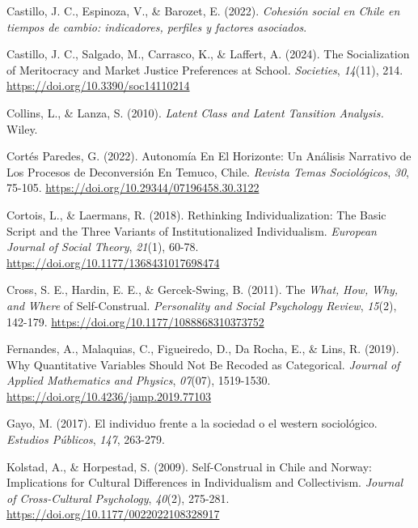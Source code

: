 \documentclass[
  12pt,
  letterpaper,
  DIV=11,
  numbers=noendperiod]{scrartcl}
\newlength{\cslhangindent}
\newenvironment{CSLReferences}[2] %
 {\begin{list}{}{%
  \setlength{\itemindent}{0pt}
  \setlength{\leftmargin}{0pt}
  \setlength{\parsep}{0pt}
  \ifodd #1
   \setlength{\leftmargin}{\cslhangindent}
   \setlength{\itemindent}{-1\cslhangindent}
  \fi
  \setlength{\itemsep}{#2\baselineskip}}}
 {\end{list}}
\begin{document}
\begin{CSLReferences}{1}{0}
Castillo, J. C., Espinoza, V., \& Barozet, E. (2022). \emph{{Cohesi{ó}n
social en Chile en tiempos de cambio: indicadores, perfiles y factores
asociados}}.

Castillo, J. C., Salgado, M., Carrasco, K., \& Laffert, A. (2024). The
{Socialization} of {Meritocracy} and {Market Justice Preferences} at
{School}. \emph{Societies}, \emph{14}(11), 214.
\url{https://doi.org/10.3390/soc14110214}

Collins, L., \& Lanza, S. (2010). \emph{Latent Class and Latent
Tansition Analysis.} Wiley.

Cortés Paredes, G. (2022). Autonom{í}a En El Horizonte: Un An{á}lisis
Narrativo de Los Procesos de Deconversi{ó}n En {Temuco}, {Chile}.
\emph{Revista Temas Sociol{ó}gicos}, \emph{30}, 75-105.
\url{https://doi.org/10.29344/07196458.30.3122}

Cortois, L., \& Laermans, R. (2018). Rethinking Individualization: {The}
Basic Script and the Three Variants of Institutionalized Individualism.
\emph{European Journal of Social Theory}, \emph{21}(1), 60-78.
\url{https://doi.org/10.1177/1368431017698474}

Cross, S. E., Hardin, E. E., \& Gercek-Swing, B. (2011). The
{\emph{What}}{\emph{,} }{\emph{How}}{\emph{,} }{\emph{Why}}{\emph{, and}
}{\emph{Where}} of {Self-Construal}. \emph{Personality and Social
Psychology Review}, \emph{15}(2), 142-179.
\url{https://doi.org/10.1177/1088868310373752}

Fernandes, A., Malaquias, C., Figueiredo, D., Da Rocha, E., \& Lins, R.
(2019). Why {Quantitative Variables Should Not Be Recoded} as
{Categorical}. \emph{Journal of Applied Mathematics and Physics},
\emph{07}(07), 1519-1530. \url{https://doi.org/10.4236/jamp.2019.77103}

Gayo, M. (2017). {El individuo frente a la sociedad o el western
sociol{ó}gico}. \emph{Estudios P{ú}blicos}, \emph{147}, 263-279.

Kolstad, A., \& Horpestad, S. (2009). Self-{Construal} in {Chile} and
{Norway}: {Implications} for {Cultural Differences} in {Individualism}
and {Collectivism}. \emph{Journal of Cross-Cultural Psychology},
\emph{40}(2), 275-281. \url{https://doi.org/10.1177/0022022108328917}


\end{CSLReferences}
\end{document}
